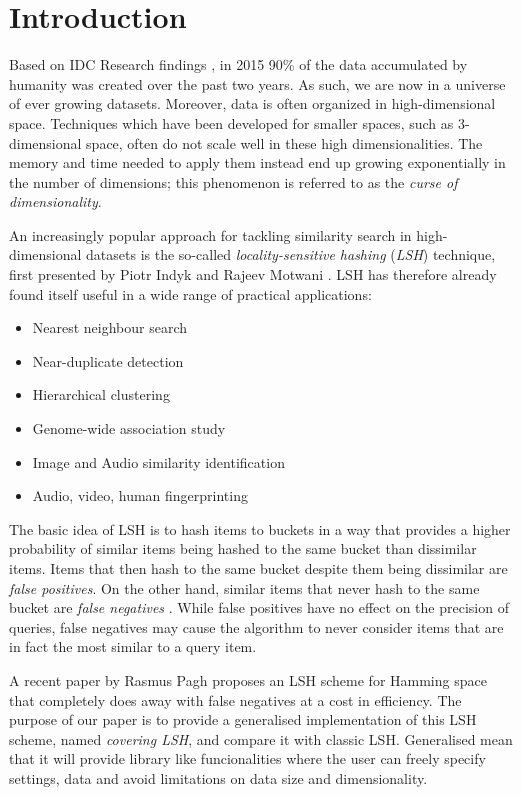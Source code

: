\section{Introduction}
\label{introduction}

Based on IDC Research findings \cite{EMC:misc/idc/Gantz11}, in 2015 90\% of the data accumulated by humanity was created over the past two years. As such, we are now in a universe of ever growing datasets. Moreover, data is often organized in high-dimensional space. Techniques which have been developed for smaller spaces, such as 3-dimensional space, often do not scale well in these high dimensionalities. The memory and time needed to apply them instead end up growing exponentially in the number of dimensions; this phenomenon is referred to as the \textit{curse of dimensionality}.

An increasingly popular approach for tackling similarity search in high-dimensional datasets is the so-called \textit{locality-sensitive hashing} (\textit{LSH}) technique, first presented by Piotr Indyk and Rajeev Motwani \cite{DBLP:conf/stoc/IndykM98}. LSH has therefore already found itself useful in a wide range of practical applications:

\begin{itemize}
  \item Nearest neighbour search
  \item Near-duplicate detection
  \item Hierarchical clustering
  \item Genome-wide association study
  \item Image and Audio similarity identification
  \item Audio, video, human fingerprinting
\end{itemize}

The basic idea of LSH is to hash items to buckets in a way that provides a higher probability of similar items being hashed to the same bucket than dissimilar items. Items that then hash to the same bucket despite them being dissimilar are \textit{false positives}. On the other hand, similar items that never hash to the same bucket are \textit{false negatives} \cite[p. 88]{DBLP:books/cu/LeskovecRU14}. While false positives have no effect on the precision of queries, false negatives may cause the algorithm to never consider items that are in fact the most similar to a query item.

A recent paper by Rasmus Pagh \cite{DBLP:journals/corr/Pagh15} proposes an LSH scheme for Hamming space that completely does away with false negatives at a cost in efficiency. The purpose of our paper is to provide a generalised implementation of this LSH scheme, named \textit{covering LSH}, and compare it with classic LSH. Generalised mean that it will provide library like funcionalities where the user can freely specify settings, data and avoid limitations on data size and dimensionality.

